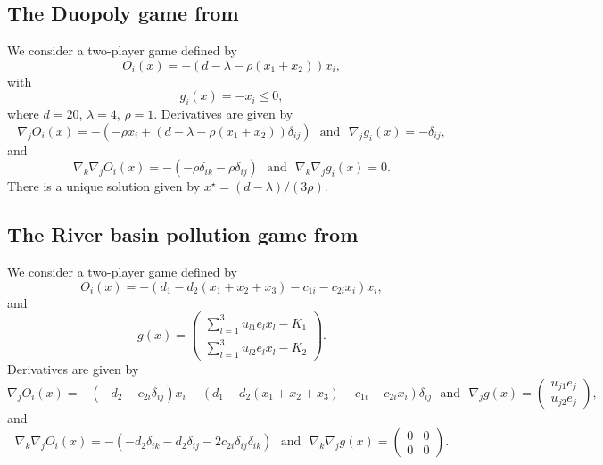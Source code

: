 \documentclass[11pt, a4paper]{article}
\newcommand{\txtm}[1]{\textrm{~~#1~~}}
\begin{document}
\subsection{The Duopoly game from \cite{krawuryasev00}}
We consider a two-player game defined by 
$$
O_i(x) = - (d- \lambda -\rho(x_1+x_2))x_i,
$$
with 
$$
g_i(x) = -x_i \leq 0,
$$
where $d = 20$, $\lambda = 4$, $\rho = 1$.
Derivatives are given by
$$
\nabla_j O_i(x) = -( -\rho x_i + (d- \lambda -\rho(x_1+x_2))\delta_{ij} )
\txtm{and}
\nabla_j g_i(x) = - \delta_{ij},
$$
and
$$
\nabla_k \nabla_j O_i(x) = -( -\rho \delta_{ik} - \rho\delta_{ij})
\txtm{and}
\nabla_k \nabla_j g_i(x) = 0.
$$
There is a unique solution given by $x^\star = (d-\lambda)/(3\rho)$.

\subsection{The River basin pollution game from \cite{krawuryasev00}}
We consider a two-player game defined by 
$$
O_i(x) = - (d_1 - d_2 (x_1+x_2+x_3) - c_{1i} - c_{2i} x_i)x_i,
$$
and
$$
g(x) = 
\left( \begin{matrix}
\sum\limits_{l=1}^3 u_{l1} e_l x_l - K_1 \\
\sum\limits_{l=1}^3 u_{l2} e_l x_l - K_2 
\end{matrix} \right).
$$
Derivatives are given by
$$
\nabla_j O_i(x) = - ( - d_2  - c_{2i} \delta_{ij})x_i - (d_1 - d_2 (x_1+x_2+x_3) - c_{1i} - c_{2i} x_i)\delta_{ij}
\txtm{and}
\nabla_j g(x) = 
\left( \begin{matrix}
u_{j1} e_j  \\
u_{j2} e_j
\end{matrix} \right),
$$
and
$$
\nabla_k \nabla_j O_i(x) = -( - d_2\delta_{ik} - d_2\delta_{ij}  - 2 c_{2i} \delta_{ij}\delta_{ik})
\txtm{and}
\nabla_k \nabla_j g(x) = 
\left( \begin{matrix}
0 & 0  \\
0 & 0
\end{matrix} \right).
$$




\newpage




\appendix
\end{document}
